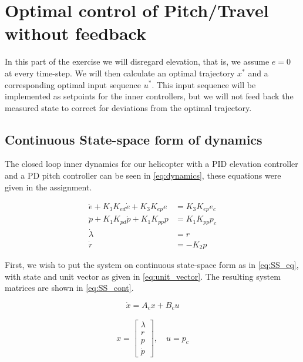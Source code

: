 \section{Optimal control of Pitch/Travel without feedback}\label{sec:ex2}
In this part of the exercise we will disregard elevation, that is, we assume $e = 0$ at every time-step. We will then calculate an optimal trajectory $x^*$ and a corresponding optimal input sequence $u^*$. This input sequence will be implemented as setpoints for the inner controllers, but we will not feed back the measured state to correct for deviations from the optimal trajectory.

\subsection{Continuous State-space form of dynamics}\label{sec:SS_cont}
The closed loop inner dynamics for our helicopter with a PID elevation controller and a PD pitch controller can be seen in \cref{eq:dynamics}, these equations were given in the assignment.

\begin{subequations}\label{eq:dynamics}
\begin{align}
    \ddot{e} + K_3K_{ed}\dot{e} + K_3K_{ep}e &= K_3K_{ep}e_c \\
    \ddot{p} + K_1K_{pd}\dot{p} + K_1K_{pp}p &= K_1K_{pp}p_c \\
    \dot{\lambda} &= r \\
    \dot{r} &= -K_2p 
\end{align}
\end{subequations}

First, we wish to put the system on continuous state-space form as in \cref{eq:SS_eq}, with state and unit vector as given in \cref{eq:unit_vector}. The resulting system matrices are shown in \cref{eq:SS_cont}. 

\begin{equation}\label{eq:SS_eq}
    \dot{x} = A_cx + B_cu
\end{equation}

\begin{equation}\label{eq:unit_vector}
    \begin{aligned}
        x =
        \begin{bmatrix} \lambda \\ r \\ p \\ \dot{p} \end{bmatrix},
        \quad
        u = p_c
    \end{aligned}
\end{equation}

